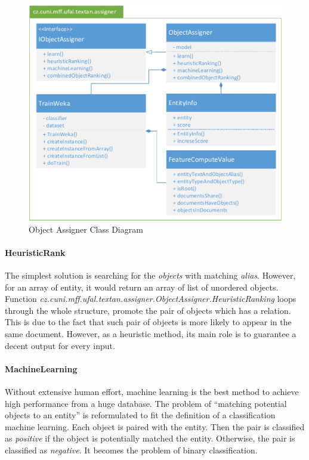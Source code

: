 \begin{figure}[!htb]
        \centering
        \includegraphics[width=\textwidth]{Images/ObjectAssignerClass}
        \caption{Object Assigner Class Diagram}
        \label{fig:objectassigner}
\end{figure}


\paragraph{HeuristicRank}
The simplest solution is searching for the \textit{objects} with matching 
\textit{alias}. However, for an array of entity, it would return an array of 
list of unordered objects. Function
\emph{cz.\-cuni.\-mff.\-ufal.\-textan.\-assigner.\-ObjectAssigner.\-HeuristicRanking}
loops through the whole structure, promote the pair of objects which has a
relation. This is due to the fact that such pair of objects is more likely to
appear in the same document. However, as a heuristic method, its main role is to
guarantee a decent output for every input.

\paragraph{MachineLearning}
Without extensive human effort, machine learning is the best method to achieve
high performance from a huge database. The problem of ``matching potential
objects to an entity'' is reformulated to fit the definition of a classification
machine learning. Each object is paired with the entity. Then the pair is
classified as \emph{positive} if the object is potentially matched the entity.
Otherwise, the pair is classified as \emph{negative}. It becomes the
problem of binary classification.



